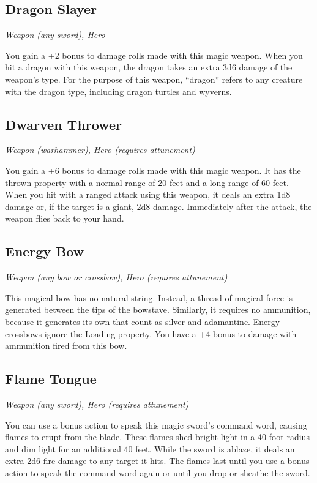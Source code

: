 \subsection{Dragon Slayer}
\textit{Weapon (any sword), Hero} 

You gain a +2 bonus to damage rolls made with this magic weapon.  When you hit a dragon with this weapon, the dragon takes an extra 3d6 damage of the weapon's type. For the purpose of this weapon, “dragon” refers to any creature with the dragon type, including dragon turtles and wyverns.

\subsection{Dwarven Thrower}
\textit{Weapon (warhammer), Hero (requires attunement)}

You gain a +6 bonus to damage rolls made with this magic weapon. It has the thrown property with a normal range of 20 feet and a long range of 60 feet. When you hit with a ranged attack using this weapon, it deals an extra 1d8 damage or, if the target is a giant, 2d8 damage. Immediately after the attack, the weapon flies back to your hand.

\subsection{Energy Bow}
\textit{Weapon (any bow or crossbow), Hero (requires attunement)}

This magical bow has no natural string. Instead, a thread of magical force is generated between the tips of the bowstave. Similarly, it requires no ammunition, because it generates its own that count as silver and adamantine. Energy crossbows ignore the Loading property. You have a +4 bonus to damage with ammunition fired from this bow.

\subsection{Flame Tongue}
\textit{Weapon (any sword), Hero (requires attunement)} 

You can use a bonus action to speak this magic sword's command word, causing flames to erupt from the blade. These flames shed bright light in a 40-foot radius and dim light for an additional 40 feet. While the sword is ablaze, it deals an extra 2d6 fire damage to any target it hits. The flames last until you use a bonus action to speak the command word again or until you drop or sheathe the sword.

